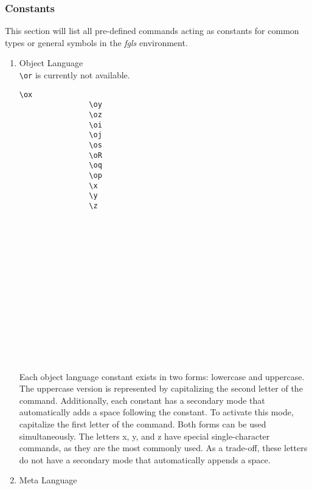 \documentclass[10pt, a4paper]{article}
\begin{document}
	\subsubsection{Constants}
	This section will list all pre-defined commands acting as constants for common types or general symbols in the \textit{fgls} environment.
	\begin{enumerate}
		\item Object Language\\\verb=\or= is currently not available.
		\begin{center}
			\begin{minipage}[h][4.8cm][t]{15em}
				\begin{lstlisting}[style=B]
				\ox
				\oy
				\oz
				\oi
				\oj
				\os
				\oR
				\oq
				\op
				\x
				\y
				\z
				\end{lstlisting}
			\end{minipage}
			\begin{minipage}[h][4.8cm][t]{15em}
				\begin{fgls}
					\ \\
					\ox\\
					\oy\\
					\oz\\
					\oi\\
					\oj\\
					\os\\
					\oR\\
					\oq\\
					\op\\
					\x\\
					\y\\
					\z
				\end{fgls}
			\end{minipage}
		\end{center}
		Each object language constant exists in two forms: lowercase and uppercase. The uppercase version is represented by capitalizing the second letter of the command. Additionally, each constant has a secondary mode that automatically adds a space following the constant. To activate this mode, capitalize the first letter of the command. Both forms can be used simultaneously. The letters x, y, and z have special single-character commands, as they are the most commonly used. As a trade-off, these letters do not have a secondary mode that automatically appends a space.
		\item Meta Language
		\begin{center}
			\begin{minipage}[h][5cm][t]{15em}

\end{minipage}
\end{center}
\end{enumerate}
\end{document}
